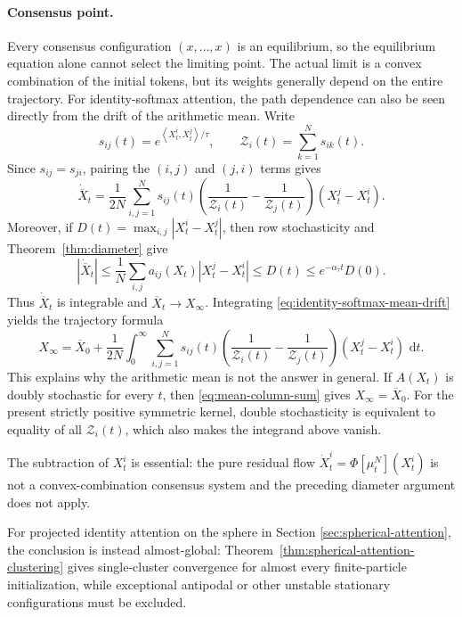 \documentclass[11pt]{amsart}
\numberwithin{equation}{section}
\theoremstyle{plain}
\newcommand{\dd}{\,\mathrm{d}}
\newcommand{\abs}[1]{\left\lvert#1\right\rvert}
\newcommand{\ip}[2]{\left\langle#1,#2\right\rangle}
\begin{document}
\paragraph{\textbf{Consensus point.}}
Every consensus configuration $(x,\ldots,x)$ is an equilibrium, so the
equilibrium equation alone cannot select the limiting point.  The actual
limit is a convex combination of the initial tokens, but its weights
generally depend on the entire trajectory. For identity-softmax attention, the path dependence can also be seen directly
from the drift of the arithmetic mean. Write
\[
 s_{ij}(t)=e^{\ip{X_t^i}{X_t^j}/\tau},
 \qquad \mathcal Z_i(t)=\sum_{k=1}^Ns_{ik}(t).
\]
Since $s_{ij}=s_{ji}$, pairing the $(i,j)$ and $(j,i)$ terms gives
\begin{equation}\label{eq:identity-softmax-mean-drift}
 \dot{\overline X}_t
 =\frac1{2N}\sum_{i,j=1}^N
 s_{ij}(t)\left(\frac1{\mathcal Z_i(t)}-
                       \frac1{\mathcal Z_j(t)}\right)
 (X_t^j-X_t^i).
\end{equation}
Moreover, if
$D(t)=\max_{i,j}\abs{X_t^i-X_t^j}$, then row stochasticity and
Theorem~\ref{thm:diameter} give
\[
 \abs{\dot{\overline X}_t}
 \leq\frac1N\sum_{i,j}a_{ij}(X_t)\abs{X_t^j-X_t^i}
 \leq D(t)\leq e^{-\alpha_\tau t}D(0).
\]
Thus $\dot{\overline X}_t$ is integrable and
$\overline X_t\to X_\infty$.  Integrating
\eqref{eq:identity-softmax-mean-drift} yields the trajectory formula
\begin{equation}\label{eq:identity-softmax-consensus-point-path}
 X_\infty=\overline X_0+
 \frac1{2N}\int_0^\infty\sum_{i,j=1}^N
 s_{ij}(t)\left(\frac1{\mathcal Z_i(t)}-
                       \frac1{\mathcal Z_j(t)}\right)
 (X_t^j-X_t^i)\,\dd t.
\end{equation}
This explains why the arithmetic mean is not the answer in general.  If
$A(X_t)$ is doubly stochastic for every $t$, then
\eqref{eq:mean-column-sum} gives
$X_\infty=\overline X_0$.  For the present strictly positive symmetric
kernel, double stochasticity is equivalent to equality of all
$\mathcal Z_i(t)$, which also makes the integrand above vanish.

\vspace{3mm}
The subtraction of $X_t^i$ is essential: the
pure residual flow $\dot X_t^i=\Phi[\mu_t^N](X_t^i)$ is not a convex-combination
consensus system and the preceding diameter argument does not apply.


For projected identity attention on the sphere in Section \ref{sec:spherical-attention}, the conclusion is instead almost-global: Theorem~\ref{thm:spherical-attention-clustering} gives
single-cluster convergence for almost every finite-particle initialization,
while exceptional antipodal or other unstable stationary configurations must be excluded.
\end{document}
